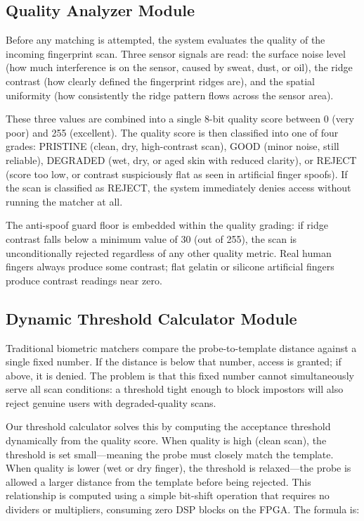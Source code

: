 \documentclass[conference]{IEEEtran}
\begin{document}
\subsection{Quality Analyzer Module}

Before any matching is attempted, the system evaluates the quality
of the incoming fingerprint scan. Three sensor signals are read:
the surface noise level (how much interference is on the sensor,
caused by sweat, dust, or oil), the ridge contrast (how clearly
defined the fingerprint ridges are), and the spatial uniformity
(how consistently the ridge pattern flows across the sensor area).

These three values are combined into a single 8-bit quality score
between 0 (very poor) and 255 (excellent). The quality score is
then classified into one of four grades: PRISTINE (clean, dry,
high-contrast scan), GOOD (minor noise, still reliable), DEGRADED
(wet, dry, or aged skin with reduced clarity), or REJECT (score
too low, or contrast suspiciously flat as seen in artificial finger
spoofs). If the scan is classified as REJECT, the system immediately
denies access without running the matcher at all.

The anti-spoof guard floor is embedded within the quality grading:
if ridge contrast falls below a minimum value of 30 (out of 255),
the scan is unconditionally rejected regardless of any other quality
metric. Real human fingers always produce some contrast; flat
gelatin or silicone artificial fingers produce contrast readings
near zero.

\subsection{Dynamic Threshold Calculator Module}

Traditional biometric matchers compare the probe-to-template distance
against a single fixed number. If the distance is below that number,
access is granted; if above, it is denied. The problem is that this
fixed number cannot simultaneously serve all scan conditions: a
threshold tight enough to block impostors will also reject genuine
users with degraded-quality scans.

Our threshold calculator solves this by computing the acceptance
threshold dynamically from the quality score. When quality is high
(clean scan), the threshold is set small---meaning the probe must
closely match the template. When quality is lower (wet or dry finger),
the threshold is relaxed---the probe is allowed a larger distance from
the template before being rejected. This relationship is computed
using a simple bit-shift operation that requires no dividers or
multipliers, consuming zero DSP blocks on the FPGA. The formula is:
\end{document}
